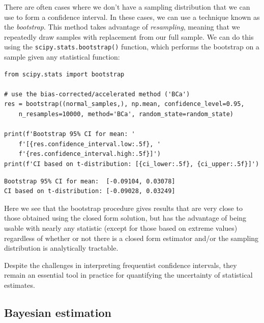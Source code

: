 There are often cases where we don't have a sampling distribution that we can use to form a confidence interval.  In these cases,  we can use a technique known as the \textit{bootstrap}.  This method takes advantage of \textit{resampling}, meaning that we repeatedly draw samples with replacement from our full sample.  We can do this using the \texttt{scipy.stats.bootstrap()} function, which performs the bootstrap on a sample given any statistical function:

\begin{lstlisting}[style=Python]
from scipy.stats import bootstrap

# use the bias-corrected/accelerated method ('BCa')
res = bootstrap((normal_samples,), np.mean, confidence_level=0.95,      
    n_resamples=10000, method='BCa', random_state=random_state)

print(f'Bootstrap 95% CI for mean: '
    f'[{res.confidence_interval.low:.5f}, '
    f'{res.confidence_interval.high:.5f}]')
print(f'CI based on t-distribution: [{ci_lower:.5f}, {ci_upper:.5f}]')
\end{lstlisting}

\begin{lstlisting}[style=shell]
Bootstrap 95% CI for mean:  [-0.09104, 0.03078]
CI based on t-distribution: [-0.09028, 0.03249]
\end{lstlisting}

Here we see that the bootstrap procedure gives results that are very close to those obtained using the closed form solution, but has the advantage of being usable with nearly any statistic (except for those based on extreme values) regardless of whether or not there is a closed form estimator and/or the sampling distribution is analytically tractable.

Despite the challenges in interpreting frequentist confidence intervals, they remain an essential tool in practice for quantifying the uncertainty of statistical estimates.  

\subsection{Bayesian estimation}

